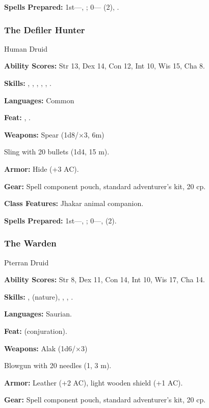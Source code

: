 \textbf{Spells Prepared:} 1st---, ; 0--- (2), .

\subsubsection{The Defiler Hunter}

Human Druid

\textbf{Ability Scores:} Str 13, Dex 14, Con 12, Int 10, Wis 15, Cha 8.

\textbf{Skills:} , , , , , .

\textbf{Languages:} Common

\textbf{Feat:} , .

\textbf{Weapons:} Spear (1d8/$\times$3, 6m)

Sling with 20 bullets (1d4, 15 m).

\textbf{Armor:} Hide (+3 AC).

\textbf{Gear:} Spell component pouch, standard adventurer's kit, 20 cp.

\textbf{Class Features:} Jhakar animal companion.

\textbf{Spells Prepared:} 1st---, ;\hskip10pt 0---,  (2).

\subsubsection{The Warden}

Pterran Druid

\textbf{Ability Scores:} Str 8, Dex 11, Con 14, Int 10, Wis 17, Cha 14.

\textbf{Skills:} ,  (nature), , , .

\textbf{Languages:} Saurian.

\textbf{Feat:}  (conjuration).

\textbf{Weapons:} Alak (1d6/$\times$3)

Blowgun with 20 needles (1, 3 m).

\textbf{Armor:} Leather (+2 AC), light wooden shield (+1 AC).

\textbf{Gear:} Spell component pouch, standard adventurer's kit, 20 cp.

